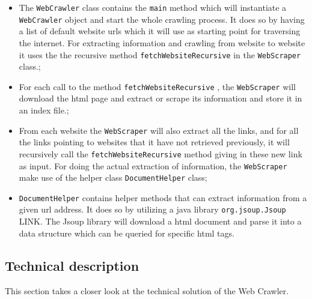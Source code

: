 \begin{itemize}
\item The {\tt WebCrawler} class contains the {\tt main} method which will instantiate a {\tt WebCrawler} object and start the whole crawling process. It does so by having a list of default website urls which it will use as starting point for traversing the internet. For extracting information and crawling from website to website it uses the the recursive method {\tt fetchWebsiteRecursive} in the {\tt WebScraper} class.;
\item For each call to the method {\tt fetchWebsiteRecursive} , the {\tt WebScraper} will download the html page and extract or scrape its information and store it in an index file.;
\item From each website the {\tt WebScraper} will also extract all the links, and for all the links pointing to websites that it have not retrieved previously, it will recursively call the {\tt fetchWebsiteRecursive} method giving in these new link as input. For doing the actual extraction of  information, the {\tt WebScraper} make use of the helper class {\tt DocumentHelper} class;
\item {\tt DocumentHelper} contains helper methods that can extract information from a given url address. It does so by utilizing a java library {\tt org.jsoup.Jsoup} LINK. The Jsoup library will download a html document and parse it into a data structure which can be queried for specific html tags. 
\end{itemize}

\subsection{Technical description}
This section takes a closer look at the technical solution of the Web Crawler. 

